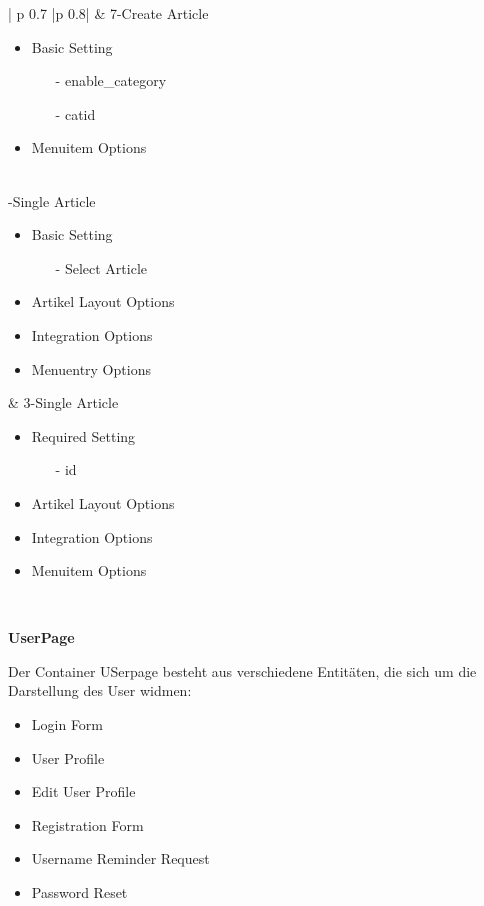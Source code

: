 \begin{minipage}{0.7\textwidth}
\begin{longtable}{| p {0.7\textwidth} |p {0.8\textwidth}|}
&
7-Create Article
\begin{itemize}
\item Basic Setting
	\begin{enumerate}
			\item[-] enable\_category 
			\item[-] catid 
	 \end{enumerate}
\item Menuitem Options
\end{itemize}
\\ -Single Article
\begin{itemize}
	\item Basic  Setting
		\begin{enumerate}
		\item[-] Select Article
		\end{enumerate}
	\item Artikel Layout Options
   	\item Integration Options
   	\item Menuentry Options
  \end{itemize}
&
3-Single Article
 \begin{itemize}
 	\item Required  Setting
 		\begin{enumerate}
 		\item[-] id
 		\end{enumerate}
 	\item Artikel Layout Options
    \item Integration Options
    \item Menuitem Options 	
\end{itemize}
\\ \hline
\end{longtable}
\end{minipage}



\textbf{UserPage}

Der Container USerpage besteht aus verschiedene Entitäten, die sich um die Darstellung des User widmen:
\begin{itemize}
	\item Login Form
	\item User Profile
	\item Edit User Profile
	\item Registration Form
	\item Username Reminder Request
	\item Password Reset
\end{itemize}


